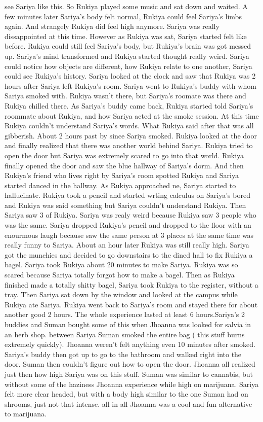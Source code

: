 \documentclass[12pt]{book}
\begin{document}
see Sariya like this. So Rukiya played some music and sat down and waited. A few minutes later Sariya's body felt normal, Rukiya could feel Sariya's limbs again. And strangely Rukiya did feel high anymore. Sariya was really dissappointed at this time. However as Rukiya was sat, Sariya started felt like before. Rukiya could still feel Sariya's body, but Rukiya's brain was got messed up. Sariya's mind transformed and Rukiya started thought really weird. Sariya could notice how objects are different, how Rukiya relate to one another, Sariya could see Rukiya's history. Sariya looked at the clock and saw that Rukiya was 2 hours after Sariya left Rukiya's room. Sariya went to Rukiya's buddy with whom Sariya smoked with. Rukiya wasn't there, but Sariya's roomate was there and Rukiya chilled there. As Sariya's buddy came back, Rukiya started told Sariya's roommate about Rukiya, and how Sariya acted at the smoke session. At this time Rukiya couldn't understand Sariya's words. What Rukiya said after that was all gibberish. About 2 hours past by since Sariya smoked. Rukiya looked at the door and finally realized that there was another world behind Sariya. Rukiya tried to open the door but Sariya was extremely scared to go into that world. Rukiya finally opened the door and saw the blue hallway of Sariya's dorm. And then Rukiya's friend who lives right by Sariya's room spotted Rukiya and Sariya started danced in the hallway. As Rukiya approached ne, Sariya started to hallucinate. Rukiya took a pencil and started wrting calculus on Sariya's bored and Rukiya was said something but Sariya couldn't understand Rukiya. Then Sariya saw 3 of Rukiya. Sariya was realy weird because Rukiya saw 3 people who was the same. Sariya dropped Rukiya's pencil and dropped to the floor with an enourmous laugh because saw the same person at 3 places at the same time was really funny to Sariya. About an hour later Rukiya was still really high. Sariya got the munchies and decided to go downstairs to the dined hall to fix Rukiya a bagel. Sariya took Rukiya about 20 minutes to make Sariya. Rukiya was so scared because Sariya totally forgot how to make a bagel. Then as Rukiya finished made a totally shitty bagel, Sariya took Rukiya to the register, without a tray. Then Sariya sat down by the window and looked at the campus while Rukiya ate Sariya. Rukiya went back to Sariya's room and stayed there for about another good 2 hours. The whole experience lasted at least 6 hours.Sariya's 2 buddies and Suman bought some of this when Jhoanna was looked for salvia in an herb shop. between Sariya Suman smoked the entire bag ( this stuff burns extremely quickly). Jhoanna weren't felt anything even 10 minutes after smoked. Sariya's buddy then got up to go to the bathroom and walked right into the door. Suman then couldn't figure out how to open the door. Jhoanna all realized just then how high Sariya was on this stuff. Suman was similar to cannabis, but without some of the haziness Jhoanna experience while high on marijuana. Sariya felt more clear headed, but with a body high similar to the one Suman had on shrooms, just not that intense. all in all Jhoanna was a cool and fun alternative to marijuana.
\end{document}
